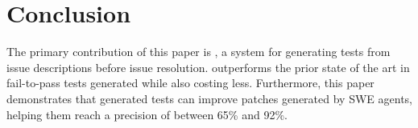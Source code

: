 \section{Conclusion}\label{sec:conclusion}

The primary contribution of this paper is \solx, a system for
generating tests from issue descriptions before issue resolution.
\solx outperforms the prior state of the art in fail-to-pass
tests generated while also costing less.  
Furthermore, this paper demonstrates that generated tests can improve
patches generated by SWE agents, helping them reach a precision of
between 65\% and 92\%. %
